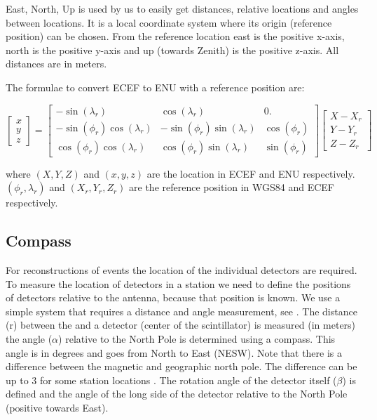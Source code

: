 East, North, Up is used by us to easily get distances, relative locations
and angles between locations. It is a local coordinate system where its
origin (reference position) can be chosen. From the reference location
east is the positive x-axis, north is the positive y-axis and up (towards
Zenith) is the positive z-axis. All distances are in meters.

The formulae to convert ECEF to ENU with a reference position are:

\begin{equation}
    \begin{bmatrix}
    x \\ y \\ z
    \end{bmatrix}
    = 
    \begin{bmatrix}
                     -\sin(\lambda_r) &               \cos(\lambda_r) &           0. \\
        -\sin(\phi_r) \cos(\lambda_r) & -\sin(\phi_r) \sin(\lambda_r) & \cos(\phi_r) \\
         \cos(\phi_r) \cos(\lambda_r) &  \cos(\phi_r) \sin(\lambda_r) & \sin(\phi_r)
    \end{bmatrix}
    \begin{bmatrix}
    X - X_r \\ Y - Y_r \\ Z - Z_r
    \end{bmatrix}
\end{equation}

where  $(X, Y, Z)$ and $(x, y, z)$ are the location in ECEF and ENU
respectively. $(\phi_r, \lambda_r)$ and $(X_r, Y_r, Z_r)$ are the
reference position in WGS84 and ECEF respectively.


\subsection{Compass}

For reconstructions of events the location of the individual detectors
are required. To measure the location of detectors in a station we need
to define the positions of detectors relative to the \gps antenna,
because that position is known. We use a simple system that requires a
distance and angle measurement, see . The
distance (r) between the \gps and a detector (center of the
scintillator) is measured (in meters) the angle ($\alpha$) relative to
the North Pole is determined using a compass. This angle is in degrees
and goes from North to East (NESW). Note that there is a difference
between the magnetic and geographic north pole. The difference can be up
to \SI{3}{\degrees} for some \hisparc station locations
\cite{magneticnorth}. The rotation angle of the detector itself
($\beta$) is defined and the angle of the long side of the detector
relative to the North Pole (positive towards East).

